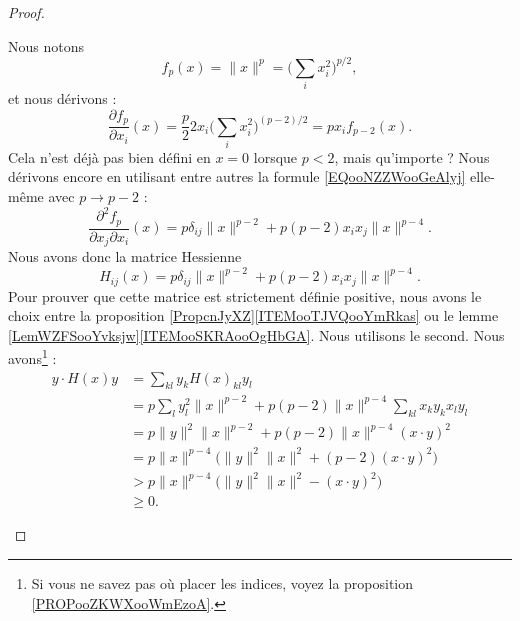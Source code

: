 \begin{proof}
	\begin{subproof}
		\spitem[La Hessienne]
		Nous notons
		\begin{equation}
			f_p(x)=\| x \|^p=\big( \sum_ix_i^2 \big)^{p/2},
		\end{equation}
		et nous dérivons :
		\begin{equation}        \label{EQooNZZWooGeAlyj}
			\frac{ \partial f_p }{ \partial x_i }(x)=\frac{ p }{2}2x_i\big( \sum_ix_i^2 \big)^{(p-2)/2}=px_if_{p-2}(x).
		\end{equation}
		Cela n'est déjà pas bien défini en \( x=0\) lorsque \( p<2\), mais qu'importe ? Nous dérivons encore en utilisant entre autres la formule \eqref{EQooNZZWooGeAlyj} elle-même avec \( p\to p-2\) :
		\begin{equation}
			\frac{ \partial^2f_p  }{ \partial x_j\partial x_i }(x)=p\delta_{ij}\| x \|^{p-2}+p(p-2)x_ix_j \| x \|^{p-4}.
		\end{equation}
		Nous avons donc la matrice Hessienne
		\begin{equation}
			H_{ij}(x)=p\delta_{ij}\| x \|^{p-2}+p(p-2)x_ix_j\| x \|^{p-4}.
		\end{equation}
		Pour prouver que cette matrice est strictement définie positive, nous avons le choix entre la proposition \ref{PropcnJyXZ}\ref{ITEMooTJVQooYmRkas} ou le lemme \ref{LemWZFSooYvksjw}\ref{ITEMooSKRAooOgHbGA}. Nous utilisons le second. Nous avons\footnote{Si vous ne savez pas où placer les indices, voyez la proposition \ref{PROPooZKWXooWmEzoA}.} :
		\begin{subequations}
			\begin{align}
				y\cdot H(x)y & = \sum_{kl}y_kH(x)_{kl}y_l                                                                      \\
				             & = p\sum_ly_l^2\| x \|^{p-2}+p(p-2)\| x \|^{p-4}\sum_{kl}x_ky_kx_ly_l                            \\
				             & = p\| y \|^2\| x \|^{p-2}+p(p-2)\| x \|^{p-4}(x\cdot y)^2                                       \\
				             & = p\| x \|^{p-4}\big( \| y \|^2\| x \|^2+(p-2)(x\cdot y)^2 \big)                                \\
				             & > p\| x \|^{p-4}\big( \| y \|^2\| x \|^2-(x\cdot y)^2 \big)         \label{SUBEQooUSZOooCqgWPE} \\
				             & \geq  0           \label{SUBEQooBXQKooZcarVv}.
			\end{align}
		\end{subequations}

\end{subproof}
\end{proof}
